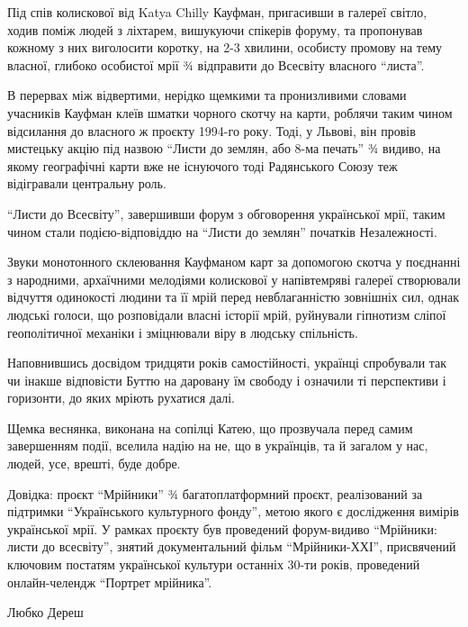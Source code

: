 Під спів колискової від Katya Chilly Кауфман, пригасивши в галереї світло,
ходив поміж людей з ліхтарем, вишукуючи спікерів форуму, та пропонував кожному
з них виголосити коротку, на 2-3 хвилини, особисту промову на тему власної,
глибоко особистої мрії ¾ відправити до Всесвіту власного \enquote{листа}. 

В перервах між відвертими, нерідко щемкими та пронизливими словами учасників
Кауфман клеїв шматки чорного скотчу на карти, роблячи таким чином відсилання до
власного ж проєкту 1994-го року. Тоді, у Львові, він провів мистецьку акцію під
назвою \enquote{Листи до землян, або 8-ма печать} ¾ видиво, на якому географічні карти
вже не існуючого тоді Радянського Союзу теж відігравали центральну роль. 

\enquote{Листи до Всесвіту}, завершивши форум з обговорення української мрії, таким
чином стали подією-відповіддю на \enquote{Листи до землян} початків Незалежності. 

Звуки монотонного склеювання Кауфманом карт за допомогою скотча у поєднанні з
народними, архаїчними мелодіями колискової у напівтемряві галереї створювали
відчуття одинокості людини та її мрій перед невблаганністю зовнішніх сил, однак
людські голоси, що розповідали власні історії мрій, руйнували гіпнотизм сліпої
геополітичної механіки і зміцнювали віру в людську спільність. 

Наповнившись досвідом тридцяти років самостійності, українці спробували так чи
інакше відповісти Буттю на даровану їм свободу і означили ті перспективи і
горизонти, до яких мріють рухатися далі. 

Щемка веснянка, виконана на сопілці Катею, що прозвучала перед самим
завершенням події, вселила надію на не, що в українців, та й загалом у нас,
людей, усе, врешті, буде добре.


Довідка: проєкт \enquote{Мрійники} ¾ багатоплатформний проєкт, реалізований за
підтримки \enquote{Українського культурного фонду}, метою якого є дослідження вимірів
української мрії. У рамках проєкту був проведений форум-видиво \enquote{Мрійники: листи
до всесвіту}, знятий документальний фільм \enquote{Мрійники-ХХІ}, присвячений ключовим
постатям української культури останніх 30-ти років, проведений онлайн-челендж
\enquote{Портрет мрійника}.

Любко Дереш
